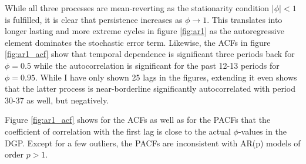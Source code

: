 While all three processes are mean-reverting as the stationarity condition $|\phi|<1$ is fulfilled, it is clear that persistence increases as $\phi\rightarrow1$. This translates into longer lasting and more extreme cycles in figure \ref{fig:ar1} as the autoregressive element dominates the stochastic error term. Likewise, the ACFs in figure \ref{fig:ar1_acf} show that temporal dependence is significant three periods back for $\phi=0.5$ while the autocorrelation is significant for the past 12-13 periods for $\phi=0.95$. While I have only shown 25 lags in the figures, extending it even shows that the latter process is near-borderline significantly autocorrelated with period 30-37 as well, but negatively.

Figure \ref{fig:ar1_acf} shows for the ACFs as well as for the PACFs that the coefficient of correlation with the first lag is close to the actual $\phi$-values in the DGP. Except for a few outliers, the PACFs are inconsistent with AR(p) models of order $p>1$.

